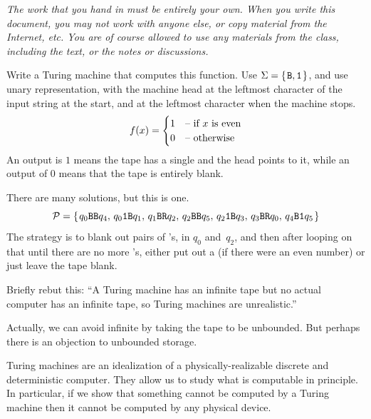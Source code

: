 \documentclass[answers, nolegalese]{examjh}
\begin{document}
\thispagestyle{empty}
\vspace*{1ex}
\begin{center}
 \parbox{0.95\textwidth}{\textit{
  The work that you hand in must be entirely your own. 
  When you write this document, you may not work with anyone else,
  or copy material from the Internet, etc.
  You are of course allowed to use any materials from the class, including
  the text, or the notes or discussions.
  }}
\end{center}
\vspace*{1ex}
\begin{questions}
\question
Write a Turing machine that computes this function.
Use $\Sigma=\set{\str{B},\str{1}}$, and use
unary representation, with the machine head at 
the leftmost character of the input string at the start, and at
the leftmost character when the machine stops.
\begin{equation*}
  f(x)=
  \begin{cases}
    1  &\text{-- if $x$ is even}  \\
    0  &\text{-- otherwise}
  \end{cases}
\end{equation*}
An output is $1$ means the tape has a single  and the head points to
it, while an output of $0$ means that the tape is entirely blank.
\begin{solution}
There are many solutions, but this is one.
\begin{equation*}
  \TM=\set{\tminstruction{0}{B}{B}{4},\,
  \tminstruction{0}{1}{B}{1},\,
  \tminstruction{1}{B}{R}{2},\,
  \tminstruction{2}{B}{B}{5},\,
  \tminstruction{2}{1}{B}{3},\,
  \tminstruction{3}{B}{R}{0},\,
  \tminstruction{4}{B}{1}{5}}
\end{equation*}
The strategy is to blank out pairs of 's, in $q_0$ and~$q_2$, and then
after looping on that until there are no more 's, either put out
a  (if there were an even number) or just leave the tape blank.
\end{solution}

\question
Briefly rebut this: ``A Turing machine has an infinite tape 
but no actual computer
has an infinite tape, so Turing machines are unrealistic.''
\begin{solution}
Actually, we can avoid infinite by taking the tape to be unbounded.
But perhaps there is an objection to unbounded storage. 

Turing machines are an idealization of a physically-realizable
discrete and deterministic computer.
They allow us to study what is computable in principle.
In particular, if we show that something cannot be computed by 
a Turing machine then it cannot be computed by any 
physical device.
\end{solution}
\end{questions}
\end{document}
